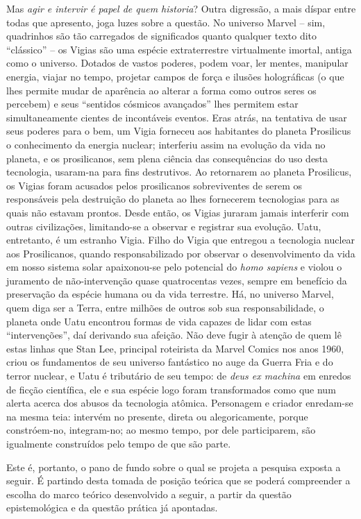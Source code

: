 Mas \textit{agir e intervir é papel de quem historia}? Outra digressão, a mais díspar entre todas que apresento, joga luzes sobre a questão. No universo Marvel -- sim, quadrinhos são tão carregados de significados quanto qualquer texto dito ``clássico'' -- os Vigias são uma espécie extraterrestre virtualmente imortal, antiga como o universo. Dotados de vastos poderes, podem voar, ler mentes, manipular energia, viajar no tempo, projetar campos de força e ilusões holográficas (o que lhes permite mudar de aparência ao alterar a forma como outros seres os percebem) e seus ``sentidos cósmicos avançados'' lhes permitem estar simultaneamente cientes de incontáveis eventos. Eras atrás, na tentativa de usar seus poderes para o bem, um Vigia forneceu aos habitantes do planeta Prosilicus o conhecimento da energia nuclear; interferiu assim na evolução da vida no planeta, e os prosilicanos, sem plena ciência das consequências do uso desta tecnologia, usaram-na para fins destrutivos. Ao retornarem ao planeta Prosilicus, os Vigias foram acusados pelos prosilicanos sobreviventes de serem os responsáveis pela destruição do planeta ao lhes fornecerem tecnologias para as quais não estavam prontos. Desde então, os Vigias juraram jamais interferir com outras civilizações, limitando-se a observar e registrar sua evolução. Uatu, entretanto, é um estranho Vigia. Filho do Vigia que entregou a tecnologia nuclear aos Prosilicanos, quando responsabilizado por observar o desenvolvimento da vida em nosso sistema solar apaixonou-se pelo potencial do \textit{homo sapiens} e violou o juramento de não-intervenção quase quatrocentas vezes, sempre em benefício da preservação da espécie humana ou da vida terrestre. Há, no universo Marvel, quem diga ser a Terra, entre milhões de outros sob sua responsabilidade, o planeta onde Uatu encontrou formas de vida capazes de lidar com estas ``intervenções'', daí derivando sua afeição. Não deve fugir à atenção de quem lê estas linhas que Stan Lee, principal roteirista da Marvel Comics nos anos 1960, criou os fundamentos de seu universo fantástico no auge da Guerra Fria e do terror nuclear, e Uatu é tributário de seu tempo: de \textit{deus ex machina} em enredos de ficção científica, ele e sua espécie logo foram transformados como que num alerta acerca dos abusos da tecnologia atômica. Personagem e criador enredam-se na mesma teia: intervém no presente, direta ou alegoricamente, porque constróem-no, integram-no; ao mesmo tempo, por dele participarem, são igualmente construídos pelo tempo de que são parte. 

Este é, portanto, o pano de fundo sobre o qual se projeta a pesquisa exposta a seguir. É partindo desta tomada de posição teórica que se poderá compreender a escolha do marco teórico desenvolvido a seguir, a partir da questão epistemológica e da questão prática já apontadas.

